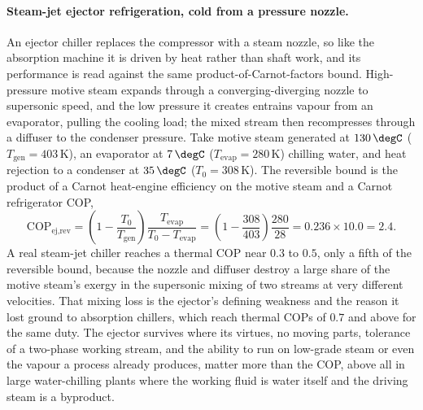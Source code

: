 \paragraph{Steam-jet ejector refrigeration, cold from a pressure nozzle.} An
ejector chiller replaces the compressor with a steam nozzle, so like the
absorption machine it is driven by heat rather than shaft work, and its
performance is read against the same product-of-Carnot-factors bound. High-pressure
motive steam expands through a converging-diverging nozzle to supersonic speed,
and the low pressure it creates entrains vapour from an evaporator, pulling the
cooling load; the mixed stream then recompresses through a diffuser to the
condenser pressure. Take motive steam generated at $130\,\degC$
($T_{\text{gen}} = 403\,\si{\kelvin}$), an evaporator at $7\,\degC$
($T_{\text{evap}} = 280\,\si{\kelvin}$) chilling water, and heat rejection to a
condenser at $35\,\degC$ ($T_0 = 308\,\si{\kelvin}$). The reversible bound is the
product of a Carnot heat-engine efficiency on the motive steam and a Carnot
refrigerator COP,
\[
\text{COP}_{\text{ej,rev}} = \left(1 - \frac{T_0}{T_{\text{gen}}}\right)
\frac{T_{\text{evap}}}{T_0 - T_{\text{evap}}} =
\left(1 - \frac{308}{403}\right)\frac{280}{28} = 0.236 \times 10.0 = 2.4.
\]
A real steam-jet chiller reaches a thermal COP near $0.3$ to $0.5$, only a fifth
of the reversible bound, because the nozzle and diffuser destroy a large share of
the motive steam's exergy in the supersonic mixing of two streams at very
different velocities. That mixing loss is the ejector's defining weakness and the
reason it lost ground to absorption chillers, which reach thermal COPs of $0.7$
and above for the same duty. The ejector survives where its virtues, no moving
parts, tolerance of a two-phase working stream, and the ability to run on
low-grade steam or even the vapour a process already produces, matter more than
the COP, above all in large water-chilling plants where the working fluid is water
itself and the driving steam is a byproduct.

